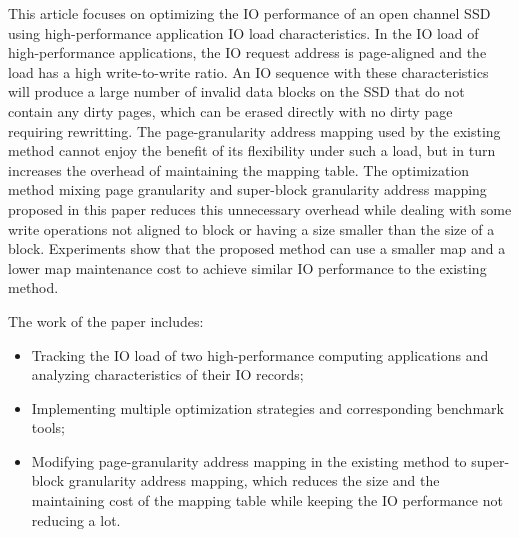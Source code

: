 \begin{eabstract}
  This article focuses on optimizing the IO performance of an open channel SSD using high-performance application IO load characteristics. In the IO load of high-performance applications, the IO request address is page-aligned and the load has a high write-to-write ratio. An IO sequence with these characteristics will produce a large number of invalid data blocks on the SSD that do not contain any dirty pages, which can be erased directly with no dirty page requiring rewritting. The page-granularity address mapping used by the existing method cannot enjoy the benefit of its flexibility under such a load, but in turn increases the overhead of maintaining the mapping table. The optimization method mixing page granularity and super-block granularity address mapping proposed in this paper reduces this unnecessary overhead while dealing with some write operations not aligned to block or having a size smaller than the size of a block. Experiments show that the proposed method can use a smaller map and a lower map maintenance cost to achieve similar IO performance to the existing method.

  The work of the paper includes:
  \begin{itemize}
    \item Tracking the IO load of two high-performance computing applications and analyzing characteristics of their IO records;
    \item Implementing multiple optimization strategies and corresponding benchmark tools;
    \item Modifying page-granularity address mapping in the existing method to super-block granularity address mapping, which reduces the size and the maintaining cost of the mapping table while keeping the IO performance not reducing a lot.
  \end{itemize}
\end{eabstract}

